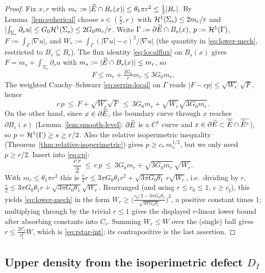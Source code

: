 \begin{proof}
Fix $x,r$ with $m_r:=|\widetilde E\cap B_r(x)|\le\theta_1\pi r^2\le\tfrac12|B_r|$.
By Lemma~\ref{lem:spherical} choose $s\in(\tfrac r2,r)$ with
$\mathcal{H}^1(\Sigma_s)\le 2m_r/r$ and $|\!\int_{\Sigma_s}\partial_{\nu}u|\le
G_0\mathcal{H}^1(\Sigma_s)\le 2G_0 m_r/r$. Write $\Gamma:=\partial\widetilde E\cap
B_s(x)$, $p:=\mathcal{H}^1(\Gamma)$, $F:=\int_\Gamma|\nabla u|$, and
$W_r:=\int_{\Gamma}(|\nabla u|-c)^2/|\nabla u|$ (the quantity in
\eqref{eq:lower-mech}, restricted to $B_s\subseteq B_r$). The flux identity
\eqref{eq:localflux} on $B_s(x)$ gives $F=m_s+\int_{\Sigma_s}\partial_\nu u$
with $m_s:=|\widetilde E\cap B_s(x)|\le m_r$, so
\begin{equation}\label{eq:F-bound}
   F\le m_r+\tfrac{2G_0}{r}m_r\le 3G_0 m_r .
\end{equation}
The weighted Cauchy--Schwarz \eqref{eq:serrin-local} on $\Gamma$ reads
$|F-cp|\le\sqrt{W_r}\,\sqrt F$, hence
\begin{equation}\label{eq:cp}
   c\,p\ \le\ F+\sqrt{W_r}\sqrt F\ \le\ 3G_0m_r+\sqrt{W_r}\sqrt{3G_0m_r}.
\end{equation}
On the other hand, since $x\in\partial\widetilde E$, the boundary curve through
$x$ reaches $\partial B_s(x)$ (Lemma~\ref{lem:smooth-level}: $\partial\widetilde E$
is a $C^1$ curve and $x\in\partial\widetilde E\subset\overline{\widetilde E}\cap
\overline{\widetilde E^c}$), so $p=\mathcal{H}^1(\Gamma)\ge s\ge r/2$. Also the relative
isoperimetric inequality (Theorem~\ref{thm:relative-isoperimetric}) gives
$p\ge c_*\,m_s^{1/2}$, but we only need $p\ge r/2$. Insert into
\eqref{eq:cp}:
\[
   \frac{c\,r}{2}\ \le\ c\,p\ \le\ 3G_0m_r+\sqrt{3G_0 m_r}\,\sqrt{W_r}.
\]
With $m_r\le\theta_1\pi r^2$ this is
$\tfrac{c}{2}r\le 3\pi G_0\theta_1 r^2+\sqrt{3\pi G_0\theta_1}\,r\sqrt{W_r}$,
i.e.\ dividing by $r$,
$\tfrac c2\le 3\pi G_0\theta_1 r+\sqrt{3\pi G_0\theta_1}\sqrt{W_r}$.
Rearranged (and using $r\le r_0\le 1$, $c\ge c_\sharp$), this yields
\eqref{eq:lower-mech} in the form $W_r\ge\bigl(\tfrac{c_\sharp/2-3\pi
G_0\theta_1}{\sqrt{3\pi G_0\theta_1}}\bigr)^2$, a positive constant times
$1$; multiplying through by the trivial $r\le1$ gives the displayed
$r$-linear lower bound after absorbing constants into $C_\flat$. Summing
$W_r\le W$ over the (single) ball gives $r\le\frac{2C_\flat}{c_\sharp^2}W$,
which is \eqref{eq:rstar-int}; its contrapositive is the last assertion.
\end{proof}

\subsection{Upper density from the isoperimetric defect $D_I$}

